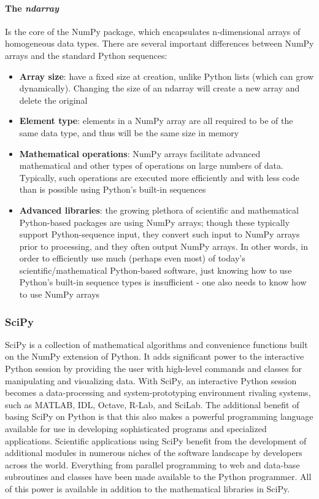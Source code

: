 \documentclass[\main/main.tex]{subfiles}
\begin{document}
\paragraph{The \textit{ndarray}} Is the core of the NumPy package, which encapsulates n-dimensional arrays of homogeneous data types. There are several important differences between NumPy arrays and the standard Python sequences:
\begin{itemize}
    \item \textbf{Array size}: have a fixed size at creation, unlike Python lists (which can grow dynamically). Changing the size of an ndarray will create a new array and delete the original
    \item \textbf{Element type}: elements in a NumPy array are all required to be of the same data type, and thus will be the same size in memory
    \item \textbf{Mathematical operations}: NumPy arrays facilitate advanced mathematical and other types of operations on large numbers of data. Typically, such operations are executed more efficiently and with less code than is possible using Python’s built-in sequences
    \item \textbf{Advanced libraries}: the growing plethora of scientific and mathematical Python-based packages are using NumPy arrays; though these typically support Python-sequence input, they convert such input to NumPy arrays prior to processing, and they often output NumPy arrays. In other words, in order to efficiently use much (perhaps even most) of today’s scientific/mathematical Python-based software, just knowing how to use Python’s built-in sequence types is insufficient - one also needs to know how to use NumPy arrays
\end{itemize}
\subsubsection{SciPy}
SciPy is a collection of mathematical algorithms and convenience functions built on the NumPy extension of Python. It adds significant power to the interactive Python session by providing the user with high-level commands and classes for manipulating and visualizing data. With SciPy, an interactive Python session becomes a data-processing and system-prototyping environment rivaling systems, such as MATLAB, IDL, Octave, R-Lab, and SciLab.
The additional benefit of basing SciPy on Python is that this also makes a powerful programming language available for use in developing sophisticated programs and specialized applications. Scientific applications using SciPy benefit from the development of additional modules in numerous niches of the software landscape by developers across the world. Everything from parallel programming to web and data-base subroutines and classes have been made available to the Python programmer. All of this power is available in addition to the mathematical libraries in SciPy. \cite{2020SciPyNMeth}
\end{document}
